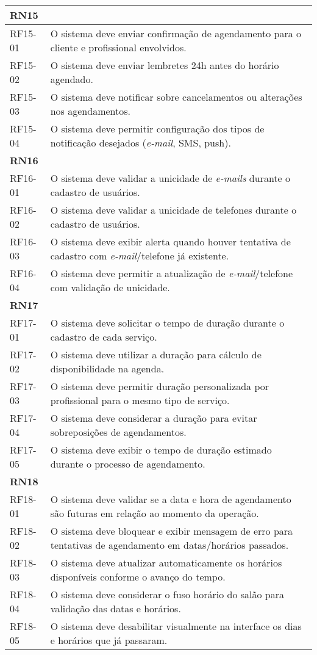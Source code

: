 \begin{longtable}{|p{}|p{}|}
	\multicolumn{2}{|l|}{\textbf{RN15}} \\ \hline
	RF15-01 & O sistema deve enviar confirmação de agendamento para o cliente e profissional envolvidos. \\ \hline
	RF15-02 & O sistema deve enviar lembretes 24h antes do horário agendado. \\ \hline
	RF15-03 & O sistema deve notificar sobre cancelamentos ou alterações nos agendamentos. \\ \hline
	RF15-04 & O sistema deve permitir configuração dos tipos de notificação desejados (\emph{e-mail}, SMS, push). \\ \hline
	
	\multicolumn{2}{|l|}{\textbf{RN16}} \\ \hline
	RF16-01 & O sistema deve validar a unicidade de \emph{e-mails} durante o cadastro de usuários. \\ \hline
	RF16-02 & O sistema deve validar a unicidade de telefones durante o cadastro de usuários. \\ \hline
	RF16-03 & O sistema deve exibir alerta quando houver tentativa de cadastro com \emph{e-mail}/telefone já existente. \\ \hline
	RF16-04 & O sistema deve permitir a atualização de \emph{e-mail}/telefone com validação de unicidade. \\ \hline
	
	\multicolumn{2}{|l|}{\textbf{RN17}} \\ \hline
	RF17-01 & O sistema deve solicitar o tempo de duração durante o cadastro de cada serviço. \\ \hline
	RF17-02 & O sistema deve utilizar a duração para cálculo de disponibilidade na agenda. \\ \hline
	RF17-03 & O sistema deve permitir duração personalizada por profissional para o mesmo tipo de serviço. \\ \hline
	RF17-04 & O sistema deve considerar a duração para evitar sobreposições de agendamentos. \\ \hline
	RF17-05 & O sistema deve exibir o tempo de duração estimado durante o processo de agendamento. \\ \hline
	
	\multicolumn{2}{|l|}{\textbf{RN18}} \\ \hline
	RF18-01 & O sistema deve validar se a data e hora de agendamento são futuras em relação ao momento da operação. \\ \hline
	RF18-02 & O sistema deve bloquear e exibir mensagem de erro para tentativas de agendamento em datas/horários passados. \\ \hline
	RF18-03 & O sistema deve atualizar automaticamente os horários disponíveis conforme o avanço do tempo. \\ \hline
	RF18-04 & O sistema deve considerar o fuso horário do salão para validação das datas e horários. \\ \hline
	RF18-05 & O sistema deve desabilitar visualmente na interface os dias e horários que já passaram. \\ \hline
	

\end{longtable}
